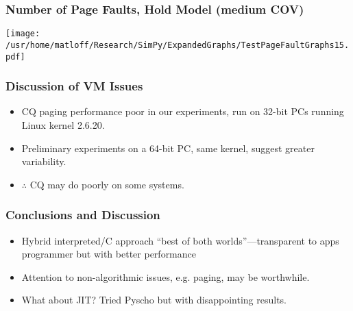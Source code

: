 \documentclass{beamer}
\begin{document}
\begin{frame}
\frametitle{Number of Page Faults, Hold Model (medium COV)}

\texttt{[image: /usr/home/matloff/Research/SimPy/ExpandedGraphs/TestPageFaultGraphs15.pdf]}

\end{frame}

\begin{frame}
\frametitle{Discussion of VM Issues}

\begin{itemize}

\pause

\item CQ paging performance poor in our experiments, run on 32-bit PCs
running Linux kernel 2.6.20.

\pause

\item Preliminary experiments on a 64-bit PC, same kernel, suggest
greater variability.

\pause

\item $\therefore$ CQ may do poorly on some systems.

\end{itemize} 

\end{frame}

\begin{frame}
\frametitle{Conclusions and Discussion}

\begin{itemize}

\pause

\item Hybrid interpreted/C approach ``best of both worlds''---transparent
to apps programmer but with better performance

\pause

\item Attention to non-algorithmic issues, e.g. paging, may be
worthwhile.

\pause

\item What about JIT? \pause Tried Pyscho but with disappointing
results.

\end{itemize}

\end{frame}
\end{document}
